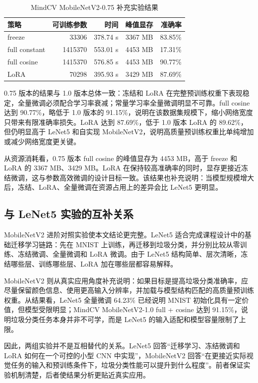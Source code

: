 \begin{table}[!htb]
  \centering
  \caption{MindCV MobileNetV2-0.75 补充实验结果}
  \label{tab:mobile_075}
  \small
  \begin{tabular}{@{}lrrrr@{}}
    \toprule
    \textbf{策略} & \textbf{可训练参数} & \textbf{时间} & \textbf{峰值显存} & \textbf{准确率} \\
    \midrule
    freeze & 33306 & 378.74 s & 3367 MB & 83.85\% \\
    full constant & 1415370 & 553.01 s & 4453 MB & 17.31\% \\
    full cosine & 1415370 & 576.85 s & 4453 MB & 90.77\% \\
    LoRA & 70298 & 395.93 s & 3429 MB & 87.69\% \\
    \bottomrule
  \end{tabular}
\end{table}

0.75 版本的结果与 1.0 版本总体一致：冻结和 LoRA 在完整预训练权重下表现稳定，全量微调必须配合学习率衰减；常量学习率全量微调明显不可靠。full cosine 达到 90.77\%，略低于 1.0 版本的 91.15\%，说明在该数据集规模下，缩小网络宽度只带来有限准确率损失。LoRA 达到 87.69\%，低于 1.0 版本 LoRA 的 89.62\%，但仍明显高于 LeNet5 和自实现 MobileNetV2，说明高质量预训练权重比单纯增加或减少网络宽度更关键。

从资源消耗看，0.75 版本 full cosine 的峰值显存为 4453 MB，高于 freeze 和 LoRA 的 3367 MB、3429 MB。LoRA 在保持较高准确率的同时，显存更接近冻结微调，这与参数高效微调的设计目标一致。该结果也补充说明：当模型规模增大后，冻结、LoRA、全量微调在资源占用上的差异会比 LeNet5 更明显。

\subsection{与 LeNet5 实验的互补关系}

MobileNetV2 进阶对照实验使本文结论更完整。LeNet5 适合完成课程设计中的基础迁移学习链路：先在 MNIST 上训练，再迁移到垃圾分类，并分别比较从零训练、冻结微调、全量微调和 LoRA 微调。由于 LeNet5 结构简单、层次清晰，冻结哪些层、训练哪些层、LoRA 加在哪些层都容易解释。

MobileNetV2 则从真实应用角度补充说明：如果目标是提高垃圾分类准确率，应尽量保留颜色信息、使用更高输入分辨率，并加载与模型结构匹配的高质量预训练权重。从结果看，LeNet5 全量微调 64.23\% 已经说明 MNIST 初始化具有一定价值，但模型受限明显；MindCV MobileNetV2-1.0 full + cosine 达到 91.15\%，说明垃圾分类任务本身并非不可学，而是 LeNet5 的输入适配和模型容量限制了上限。

因此，两组实验并不是互相替代的关系。LeNet5 回答“迁移学习、冻结微调和 LoRA 如何在一个可控的小型 CNN 中实现”，MobileNetV2 回答“在更接近实际视觉任务的输入和预训练条件下，垃圾分类性能可以提升到什么程度”。前者保证实验机制清楚，后者使结果分析更贴近真实应用。
